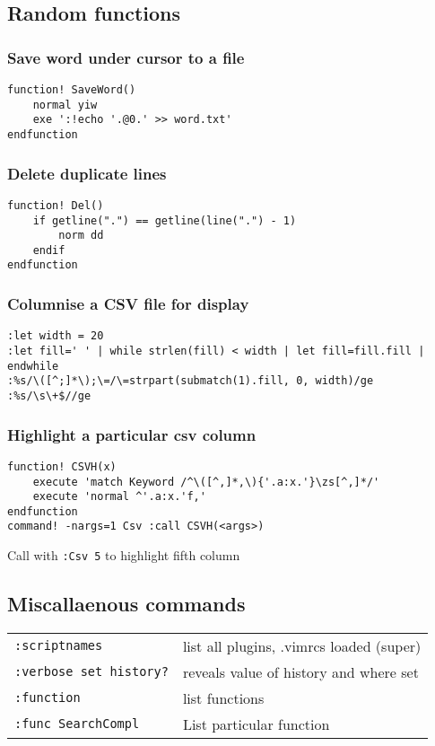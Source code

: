 \subsection{Random functions}

\subsubsection{Save word under cursor to a file}

\begin{verbatim}
function! SaveWord()
    normal yiw
    exe ':!echo '.@0.' >> word.txt'
endfunction
\end{verbatim}

\subsubsection{Delete duplicate lines}

\begin{verbatim}
function! Del()
    if getline(".") == getline(line(".") - 1)
        norm dd
    endif
endfunction
\end{verbatim}

\subsubsection{Columnise a CSV file for display}

\begin{verbatim}
:let width = 20
:let fill=' ' | while strlen(fill) < width | let fill=fill.fill | endwhile
:%s/\([^;]*\);\=/\=strpart(submatch(1).fill, 0, width)/ge
:%s/\s\+$//ge
\end{verbatim}

\subsubsection{Highlight a particular csv column}

\begin{verbatim}
function! CSVH(x)
    execute 'match Keyword /^\([^,]*,\){'.a:x.'}\zs[^,]*/'
    execute 'normal ^'.a:x.'f,'
endfunction
command! -nargs=1 Csv :call CSVH(<args>)
\end{verbatim}

Call with \verb!:Csv 5! to highlight fifth column

\subsection{Miscallaenous commands}
\begin{center}
\begin{longtable}{l|l}
 \verb!:scriptnames! & list all plugins, .vimrcs loaded (super)\\
 \verb!:verbose set history?! & reveals value of history and where set\\
 \verb!:function! & list functions\\
 \verb!:func SearchCompl! & List particular function
\end{longtable}
\end{center}

